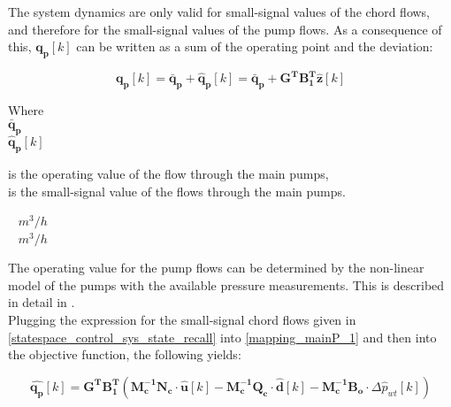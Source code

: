 The system dynamics are only valid for small-signal values of the chord flows, and therefore for the small-signal values of the pump flows. As a consequence of this, $\bm{q_p}[k]$ can be written as a sum of the operating point and the deviation:  

\begin{equation}
\bm{q_p}[k]  = \bm{\bar{q}_p} + \bm{\hat{q}_p}[k] = \bm{\bar{q}_p} + \bm{G^T} \bm{B_{1}^T}  \bm{\hat{z}}[k]
\label{mapping_mainP_1}
\end{equation}

\begin{minipage}[t]{0.20\textwidth}
Where\\
\hspace*{8mm} $ \bm{\bar{q}_p} $ \\
\hspace*{8mm} $ \bm{\hat{q}_p}[k] $ 
\end{minipage}
\begin{minipage}[t]{0.68\textwidth}
\vspace*{2mm}
is the operating value of the flow through the main pumps, \\
is the small-signal value of the flows through the main pumps. 
\end{minipage}
\begin{minipage}[t]{0.10\textwidth}
\vspace*{1.8mm}
\textcolor{White}{te}$\unit{m^3/h}$\\
\textcolor{White}{te}$\unit{m^3/h}$
\end{minipage}

The operating value for the pump flows can be determined by the non-linear model of the pumps with the available pressure measurements. This is described in detail in . 
\\
Plugging the expression for the small-signal chord flows given in \eqref{statespace_control_sys_state_recall} into \eqref{mapping_mainP_1} and then into the objective function, the following yields:


 \begin{equation}
 \bm{\hat{q_{p}}}[k] =   \bm{G^T} \bm{B_{1}^T}(\bm{M_c^{-1}}\bm{N_c} \cdot \bm{\hat{u}}[k] -\bm{M_c^{-1}}\bm{Q_c} \cdot \bm{\hat{d}}[k] -\bm{M_c^{-1}}\bm{B_{o}} \cdot \Delta \hat{p}_{wt}[k])   
 \label{mappingandstates}
\end{equation}

